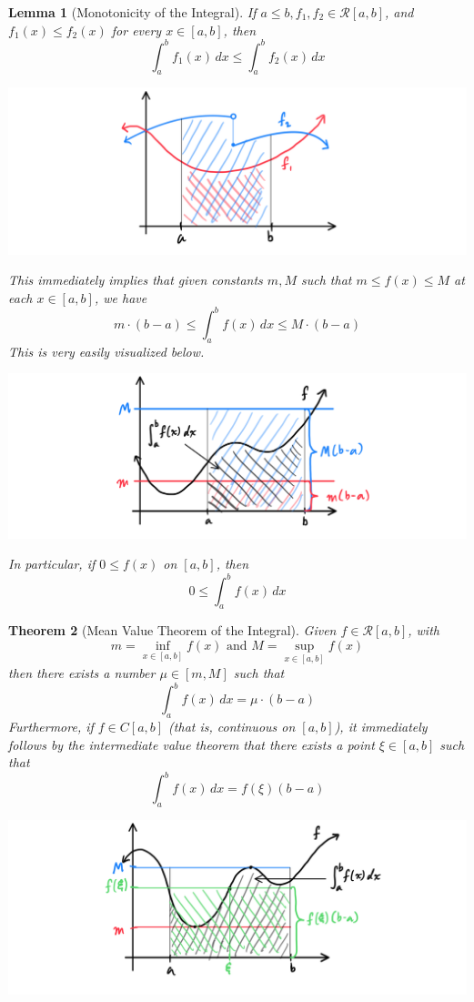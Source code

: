 \documentclass{article}
\newtheorem{theorem}{Theorem}[section]
\newtheorem{lemma}[theorem]{Lemma}
\theoremstyle{remark}
\theoremstyle{definition}
\begin{document}
\begin{lemma}[Monotonicity of the Integral]
If $a \leq b, f_1, f_2 \in \mathcal{R}[a, b]$, and $f_1 (x) \leq f_2 (x)$ for every $x \in [a, b]$, then
\[\int_a^b f_1 (x)\,dx \leq \int_a^b f_2 (x)\,dx\]
\begin{center}
    \includegraphics[scale=0.27]{img/Monotonicity_of_Integral.PNG}
\end{center}
This immediately implies that given constants $m, M$ such that $m \leq f(x) \leq M$ at each $x \in [a, b]$, we have
\[m \cdot (b - a) \leq \int_a^b f(x)\,dx \leq M \cdot (b-a)\]
This is very easily visualized below. 
\begin{center}
    \includegraphics[scale=0.27]{img/Monotonicity_of_Intergral_2.PNG}
\end{center}
In particular, if $0 \leq f(x)$ on $[a, b]$, then
\[0 \leq \int_a^b f(x)\,dx\]
\end{lemma}

\begin{theorem}[Mean Value Theorem of the Integral]
Given $f \in \mathcal{R}[a, b]$, with 
\[m = \inf_{x \in [a, b]} f(x) \text{ and } M = \sup_{x \in [a, b]} f(x)\]
then there exists a number $\mu \in [m, M]$ such that
\[\int_a^b f(x)\,dx = \mu \cdot (b - a)\]
Furthermore, if $f \in C[a, b]$ (that is, continuous on $[a, b]$), it immediately follows by the intermediate value theorem that there exists a point $\xi \in [a, b]$ such that
\[\int_a^b f(x)\,dx = f(\xi) (b - a)\]
\begin{center}
    \includegraphics[scale=0.27]{img/Mean_Plus_Intermediate_Value_Theorem_Integral.PNG}
\end{center}
\end{theorem}
\end{document}
